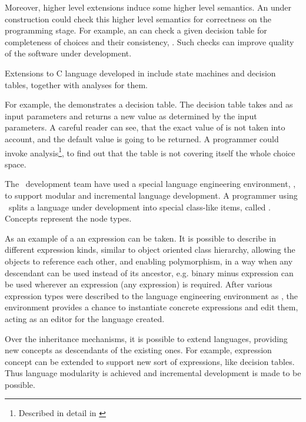 
Moreover, higher level extensions induce some higher level semantics. An  under construction could check 
this higher level semantics for correctness on the programming stage. For example, an  can check a given decision table 
for completeness of choices and their consistency, \cite{2012_ratiu_modular_dsls_and_analyses}. Such checks can improve 
quality of the software under development. 

Extensions to C language developed in  include state machines and decision tables, together with analyses
for them.

For example, the  demonstrates a decision table. The decision table takes  and  as input parameters
and returns a new  value as determined by the input parameters. A careful reader can see, that the exact value  of 
is not taken into account, and the default value  is going to be returned. A programmer could invoke analysis\footnote{Described in detail 
in  \cite{2012_ratiu_modular_dsls_and_analyses}}, to find out that the table is not covering itself the whole choice space.

The \mbdr\ development team have used a special language engineering environment, , to support modular and incremental 
language development.  A programmer using \jbmps\ splits a language under development into special class-like items, 
called . Concepts represent the  node types. 

As an example of a  an expression can be taken. It is possible to describe in  different 
expression kinds, similar to object oriented class hierarchy, allowing the objects to reference each other, 
and enabling polymorphism, in a way when any descendant can be used instead of its ancestor, e.g. 
binary minus expression can be used wherever an expression (any expression) is required. 
After various expression types were described to the language engineering environment as , 
the environment provides a chance to instantiate concrete expressions and edit them, acting as an editor for 
the language created.

Over the inheritance mechanisms, it is possible to extend languages, providing new concepts as descendants of 
the existing ones. For example, expression concept can be extended to support new sort of expressions, like decision tables.
Thus language modularity is achieved and incremental development is made to be possible.

